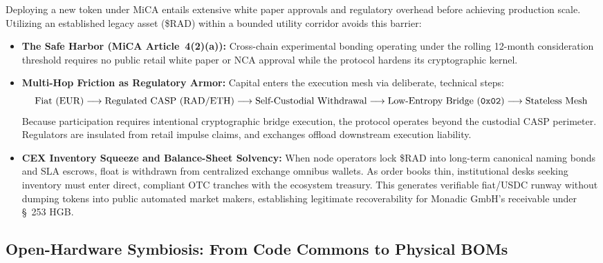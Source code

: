 \documentclass[a4paper,11pt,twoside,parskip=half-,headings=small]{scrartcl}
\begin{document}
Deploying a new token under MiCA entails extensive white paper approvals and regulatory overhead before achieving production scale. Utilizing an established legacy asset (\$RAD) within a bounded utility corridor avoids this barrier:
\begin{itemize}
  \item \textbf{The  Safe Harbor (MiCA Article~4(2)(a)):} Cross-chain experimental bonding operating under the rolling 12-month  consideration threshold requires no public retail white paper or NCA approval while the protocol hardens its cryptographic kernel.
  \item \textbf{Multi-Hop Friction as Regulatory Armor:} Capital enters the execution mesh via deliberate, technical steps:
  \begin{equation}
    \text{Fiat (EUR)} \longrightarrow \text{Regulated CASP (RAD/ETH)} \longrightarrow \text{Self-Custodial Withdrawal} \longrightarrow \text{Low-Entropy Bridge (\texttt{0x02})} \longrightarrow \text{Stateless Mesh}
  \end{equation}
  Because participation requires intentional cryptographic bridge execution, the protocol operates beyond the custodial CASP perimeter. Regulators are insulated from retail impulse claims, and exchanges offload downstream execution liability.
  \item \textbf{CEX Inventory Squeeze and Balance-Sheet Solvency:} When node operators lock \$RAD into long-term canonical naming bonds and SLA escrows, float is withdrawn from centralized exchange omnibus wallets. As order books thin, institutional desks seeking inventory must enter direct, compliant OTC tranches with the ecosystem treasury. This generates verifiable fiat/USDC runway without dumping tokens into public automated market makers, establishing legitimate recoverability for Monadic GmbH's  receivable under \S~253 HGB.
\end{itemize}

\subsection{Open-Hardware Symbiosis: From Code Commons to Physical BOMs}
\label{sec:hardware_symbiosis}
\end{document}
